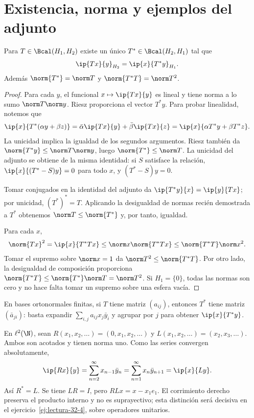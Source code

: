 \section{Existencia, norma y ejemplos del adjunto}
\begin{teorema}\label{ch32:adjunto}
Para $T\in\Bcal(H_1,H_2)$ existe un único $T^*\in\Bcal(H_2,H_1)$ tal que
\[
 \ip{Tx}{y}_{H_2}=\ip{x}{T^*y}_{H_1}.
\]
Además $\norm{T^*}=\norm T$ y $\norm{T^*T}=\norm T^2$.
\end{teorema}
\begin{proof}
Para cada $y$, el funcional $x\mapsto\ip{Tx}{y}$ es lineal y tiene norma a lo sumo $\norm T\norm y$. Riesz proporciona el vector $T^*y$. Para probar linealidad, notemos que
\[
 \ip{x}{T^*(\alpha y+\beta z)}
 =\bar\alpha\ip{Tx}{y}+\bar\beta\ip{Tx}{z}
 =\ip{x}{\alpha T^*y+\beta T^*z}.
\]
La unicidad implica la igualdad de los segundos argumentos. Riesz también da $\norm{T^*y}\leq\norm T\norm y$, luego $\norm{T^*}\leq\norm T$. La unicidad del adjunto se obtiene de la misma identidad: si $S$ satisface la relación, $\ip{x}{(T^*-S)y}=0$ para todo $x$, y $(T^*-S)y=0$.

Tomar conjugados en la identidad del adjunto da $\ip{T^*y}{x}=\ip{y}{Tx}$; por unicidad, $(T^*)^*=T$. Aplicando la desigualdad de normas recién demostrada a $T^*$ obtenemos $\norm T\leq\norm{T^*}$ y, por tanto, igualdad.

Para cada $x$,
\[
 \norm{Tx}^{2}=\ip{x}{T^*Tx}\leq\norm x\norm{T^*Tx}
 \leq\norm{T^*T}\norm x^{2}.
\]
Tomar el supremo sobre $\norm x=1$ da $\norm T^{2}\leq\norm{T^*T}$. Por otro lado, la desigualdad de composición proporciona
$\norm{T^*T}\leq\norm{T^*}\norm T=\norm T^{2}$. Si $H_1=\{0\}$, todas las normas son cero y no hace falta tomar un supremo sobre una esfera vacía.
\end{proof}

\begin{ejemplo}
En bases ortonormales finitas, si $T$ tiene matriz $(a_{ij})$, entonces $T^*$ tiene matriz $(\bar a_{ji})$: basta expandir $\sum_{i,j}a_{ij}x_j\bar y_i$ y agrupar por $j$ para obtener $\ip{x}{T^*y}$.

En $\ell^{2}(\N)$, sean $R(x_1,x_2,\dots)=(0,x_1,x_2,\dots)$ y $L(x_1,x_2,\dots)=(x_2,x_3,\dots)$. Ambos son acotados y tienen norma uno. Como las series convergen absolutamente,
\[
 \ip{Rx}{y}=\sum_{n=2}^{\infty}x_{n-1}\bar y_n
 =\sum_{n=1}^{\infty}x_n\bar y_{n+1}=\ip{x}{Ly}.
\]
Así $R^*=L$. Se tiene $LR=I$, pero $RLx=x-x_1e_1$. El corrimiento derecho preserva el producto interno y no es suprayectivo; esta distinción será decisiva en el ejercicio~\ref{ej:lectura-32-4}, sobre operadores unitarios.
\end{ejemplo}

